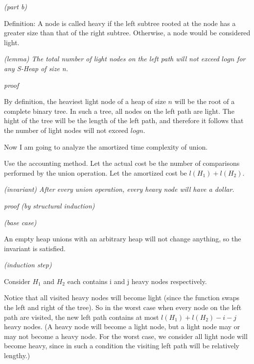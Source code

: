 \documentclass[a4paper, 10pt]{article}
\begin{document}
{{\noindent\large\it(part b)}

Definition: A node is called heavy if the left subtree rooted at the node has a greater size than that of the right subtree. Otherwise, a node would be considered light.

{\it
(lemma) The total number of light nodes on the left path will not exceed $log n$ for any S-Heap of size n.
}
\begin{addmargin}[15pt]{0in}
{
\textit{proof}

By definition, the heaviest light node of a heap of size $n$ will be the root of a complete binary tree. In such a tree, all nodes on the left path are light. The hight of the tree will be the length of the left path, and therefore it follows that the number of light nodes will not exceed $log n$.
}
\end{addmargin}

Now I am going to analyze the amortized time complexity of union.

Use the accounting method. Let the actual cost be the number of comparisons performed by the union operation. Let the amortized cost be $l(H_1) + l(H_2)$.

{\it
(invariant) After every union operation, every heavy node will have a dollar.
}
\begin{addmargin}[15pt]{0in}
{
\textit{proof (by structural induction)}

{\noindent \it (base case)}

An empty heap unions with an arbitrary heap will not change anything, so the invariant is satisfied.

{\noindent \it (induction step)}

Consider $H_1$ and $H_2$ each contains i and j heavy nodes respectively.

Notice that all visited heavy nodes will become light (since the function swaps the left and right of the tree). So in the worst case when every node on the left path are visited, the new left path contains at most $l(H_1) + l(H_2) - i - j$ heavy nodes. (A heavy node will become a light node, but a light node may or may not become a heavy node. For the worst case, we consider all light node will become heavy, since in such a condition the visiting left path will be relatively lengthy.)

}
\end{addmargin}}
\end{document}
